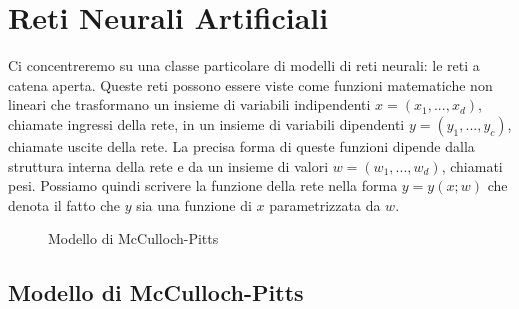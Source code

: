 \documentclass[11pt,a4paper,twoside,
openright]{book}
\newcommand{\addsymbol}{\draw[thick] (0.5em,0.5em) -- (0,0.5em) -- 
                        (0,-0.5em) --  (-0.5em,-0.5em)
                        (0em,0.75em) -- (0em,-0.75em)
                        (0.75em,0em) -- (-0.75em,0em);}
\begin{document}
\section{Reti Neurali Artificiali}
\label{section:retiartificiali}
Ci concentreremo su una classe particolare di modelli di reti neurali: le reti a catena aperta. Queste reti possono essere viste come funzioni matematiche non lineari che trasformano un insieme di variabili indipendenti $x = (x_{1}, ... , x_{d})$, chiamate ingressi della rete, in un insieme di variabili dipendenti $y = (y_{1}, ... , y_{c})$, chiamate uscite della rete. La precisa forma di queste funzioni dipende dalla struttura interna della rete e da un insieme di valori $w = (w_{1}, ... , w_{d})$, chiamati pesi. Possiamo quindi scrivere la funzione della rete nella forma $y = y(x; w)$ che denota il fatto che $y$ sia una funzione di $x$ parametrizzata da $w$.

\begin{figure}[h!]
\begin{center}
\end{center}
\caption{Modello di McCulloch-Pitts}
\label{fig:mcpitts}
\end{figure}
\subsection*{Modello di McCulloch-Pitts}
\end{document}
